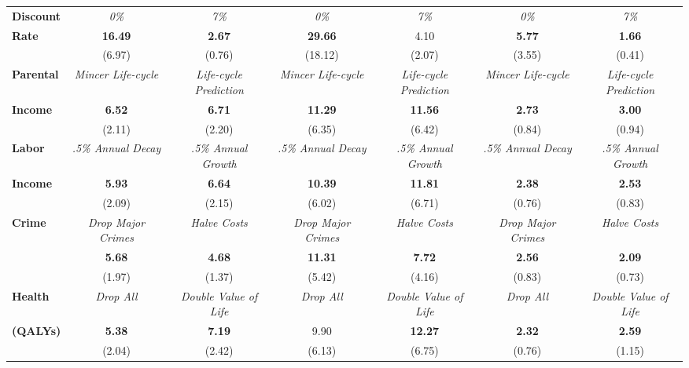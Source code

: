 \begin{tabular}{>{\bfseries}lcc|cc|cc}
Discount 	&	\textit{0\%}	&	\textit{7\%}	&	\textit{0\%}	&	\textit{7\%}	&	\textit{0\%}	&	\textit{7\%}	\\
Rate	&	\textbf{16.49}	&	\textbf{2.67}	&	\textbf{29.66}	&	4.10	&	\textbf{5.77}	&	\textbf{1.66}	\\
	&	(6.97)	&	(0.76)	&	(18.12)	&	(2.07)	&	(3.55)	&	(0.41)	\\ \midrule
Parental	&	\textit{Mincer Life-cycle}	&	\textit{Life-cycle Prediction}	&	\textit{Mincer Life-cycle}	&	\textit{Life-cycle Prediction}	&	\textit{Mincer Life-cycle}	&	\textit{Life-cycle Prediction}	\\
Income	&	\textbf{6.52}	&	\textbf{6.71}	&	\textbf{11.29}	&	\textbf{11.56}	&	\textbf{2.73}	&	\textbf{3.00}	\\
	&	(2.11)	&	(2.20)	&	(6.35)	&	(6.42)	&	(0.84)	&	(0.94)	\\ \midrule
Labor	&	\textit{.5\% Annual Decay}	&	\textit{.5\% Annual Growth}	&	\textit{.5\% Annual Decay}	&	\textit{.5\% Annual Growth}	&	\textit{.5\% Annual Decay}	&	\textit{.5\% Annual Growth}	\\
Income	&	\textbf{5.93}	&	\textbf{6.64}	&	\textbf{10.39}	&	\textbf{11.81}	&	\textbf{2.38}	&	\textbf{2.53}	\\
	&	(2.09)	&	(2.15)	&	(6.02)	&	(6.71)	&	(0.76)	&	(0.83)	\\ \midrule
Crime	&	\textit{Drop Major Crimes}	&	\textit{Halve Costs}	&	\textit{Drop Major Crimes}	&	\textit{Halve Costs}	&	\textit{Drop Major Crimes}	&	\textit{Halve Costs}	\\
	&	\textbf{5.68}	&	\textbf{4.68}	&	\textbf{11.31}	&	\textbf{7.72}	&	\textbf{2.56}	&	\textbf{2.09}	\\
	&	(1.97)	&	(1.37)	&	(5.42)	&	(4.16)	&	(0.83)	&	(0.73)	\\ \midrule
Health	&	\textit{Drop All}	&	\textit{Double Value of Life}	&	\textit{Drop All}	&	\textit{Double Value of Life}	&	\textit{Drop All}	&	\textit{Double Value of Life}	\\
(QALYs)	&	\textbf{5.38}	&	\textbf{7.19}	&	9.90	&	\textbf{12.27}	&	\textbf{2.32}	&	\textbf{2.59}	\\
	&	(2.04)	&	(2.42)	&	(6.13)	&	(6.75)	&	(0.76)	&	(1.15)	\\ \bottomrule
\end{tabular} 